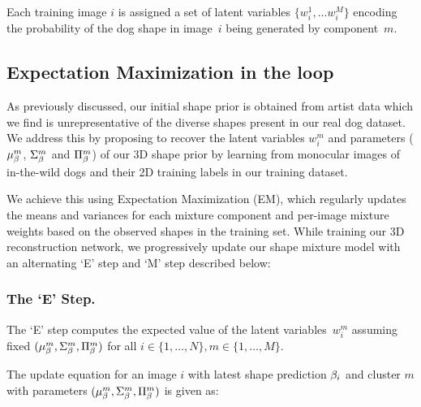 Each training image $i$ is assigned a set of latent variables $\{w_{i}^{1}, \dots w_{i}^{M}\}$ encoding the probability of the dog shape in image~$i$ being generated by component~$m$. 

\subsection{Expectation Maximization in the loop}

As previously discussed, our initial shape prior is obtained from artist data which we find is unrepresentative of the diverse shapes present in our real dog dataset. We address this by proposing to recover the latent variables $w_{i}^{m}$ and parameters ($\mu_{\beta}^{m}$, $\Sigma_{\beta}^{m}$ and $\Pi_{\beta}^{m}$) of our 3D shape prior by learning from monocular images of in-the-wild dogs and their 2D training labels in our training dataset.

We achieve this using Expectation Maximization (EM), which regularly updates the means and variances for each mixture component and per-image mixture weights based on the observed shapes in the training set. While training our 3D reconstruction network, we progressively update our shape mixture model with an alternating `E' step and `M' step described below:

\subsubsection{The `E' Step.}
The `E' step computes the expected value of the latent variables~$w_{i}^{m}$ 
assuming fixed $(\mu_{\beta}^{m}, \Sigma_{\beta}^{m}, \Pi_{\beta}^{m})$ for all $i \in \{1,\dots,N\}, m \in \{1,\dots,M\}$.

The update equation for an image $i$ with latest shape prediction $\beta_{i}$ 
and cluster $m$ with parameters $(\mu_{\beta}^{m}, \Sigma_{\beta}^{m}, \Pi_{\beta}^{m})$ 
is given as:


